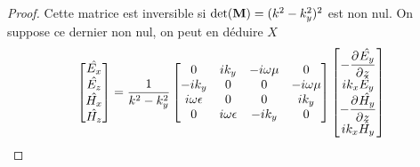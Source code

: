 \begin{proof}
            Cette matrice est inversible si \(\det(\mM) = (k^2 - k_y^2)^2 \) est non nul.
            On suppose ce dernier non nul, on peut en déduire \(X\)
            \begin{equation*}
              \begin{bmatrix}
                \hat{E_x}\\
                \hat{E_z}\\
                \hat{H_x}\\
                \hat{H_z}
              \end{bmatrix} =
              \frac{1}{k^2 - k_y^2}
              \begin{bmatrix}
              0 & ik_y & -i\w\mu & 0
              \\
              -ik_y & 0 & 0 & -i\w\mu
              \\
              i\w\eps & 0 & 0 & ik_y
              \\
              0 & i\w\eps & -ik_y & 0
              \end{bmatrix}
              \begin{bmatrix}
                -\ddr{z}{\hat{E_y}}\\
                ik_x\hat{E_y}\\
                -\ddr{z}{\hat{H_y}}\\
                ik_x\hat{H_y}
              \end{bmatrix}
            \end{equation*}


\end{proof}
